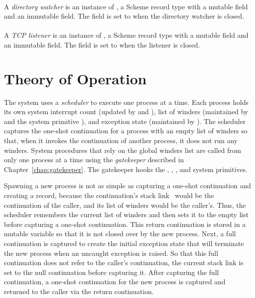 \paragraph {}
A \emph{directory watcher} is an instance of
, a Scheme record type with a mutable
 field and an immutable  field. The
 field is set to  when the directory
watcher is closed.

\paragraph {}
A \emph{TCP listener} is an instance of
, a Scheme record type with a mutable 
field and an immutable  field. The 
field is set to  when the listener is closed.

\section {Theory of Operation}\label{sec:erlang-theory}

The system uses a \emph{scheduler} to execute one
process at a time. Each process holds its own system interrupt count
(updated by  and ),
list of winders (maintained by  and the system
primitive ), and exception state (maintained
by ). The scheduler captures the
one-shot continuation for a process with an empty list of winders so
that, when it invokes the continuation of another process, it does not
run any winders.  \mitigation
System procedures that rely on the global winders list are called from
only one process at a time using the
\emph{gatekeeper} described in
Chapter~\ref{chap:gatekeeper}. The gatekeeper hooks the ,
, , and  system
primitives.

Spawning a new process is not as simple as capturing a one-shot
continuation and creating a  record, because the
continuation's stack link~\cite{representing-control} would be the
continuation of the caller, and its list of winders would be the
caller's. Thus, the scheduler remembers the current list of winders
and then sets it to the empty list before capturing a one-shot
continuation.  This return continuation is stored in a mutable
variable so that it is not closed over by the new process.  Next, a
full continuation is captured to create the initial exception state
that will terminate the new process when an uncaught exception is
raised. So that this full continuation does not refer to the caller's
continuation, the current stack link is set to the null continuation
before capturing it. After capturing the full continuation, a one-shot
continuation for the new process is captured and returned to the
caller via the return continuation.

